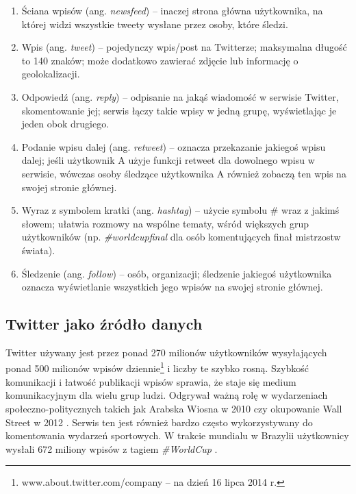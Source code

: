 \begin{enumerate}
  \item Ściana wpisów (ang. \textit{newsfeed}) -- inaczej strona główna 
  użytkownika, na której widzi wszystkie tweety wysłane przez osoby, które śledzi.
  
  \item Wpis (ang. \textit{tweet}) -- pojedynczy wpis/post na Twitterze; 
  maksymalna długość to 140 znaków; może dodatkowo zawierać zdjęcie lub 
  informację o geolokalizacji.

  \item Odpowiedź (ang. \textit{reply}) -- odpisanie na jakąś wiadomość w serwisie
  Twitter, skomentowanie jej; serwis łączy takie wpisy w jedną grupę, wyświetlając
  je jeden obok drugiego.
  
  \item Podanie wpisu dalej (ang. \textit{retweet}) -- oznacza przekazanie 
  jakiegoś wpisu dalej; jeśli użytkownik A użyje funkcji
  retweet dla dowolnego wpisu w serwisie, wówczas osoby śledzące użytkownika A
  również zobaczą ten wpis na swojej stronie głównej.
  
  \item Wyraz z symbolem kratki (ang. \textit{hashtag}) -- użycie symbolu \# 
  wraz z jakimś słowem; ułatwia rozmowy na wspólne tematy, wśród większych grup
  użytkowników (np. \textit{\#worldcupfinal} dla osób komentujących finał 
  mistrzostw świata).

  \item Śledzenie (ang. \textit{follow}) -- osób, organizacji; śledzenie 
  jakiegoś użytkownika oznacza wyświetlanie wszystkich jego wpisów na swojej 
  stronie głównej.
\end{enumerate} 

\subsection{Twitter jako źródło danych}
\label{subsection:twitterjakozrodlodanych}
Twitter używany jest przez ponad 270 milionów użytkowników wysyłających ponad
500 milionów wpisów dziennie\footnote{www.about.twitter.com/company -- na dzień 16
lipca 2014 r.} i liczby te szybko rosną.
Szybkość komunikacji i łatwość publikacji wpisów
sprawia, że staje się medium komunikacyjnym dla wielu grup ludzi.
Odgrywał ważną rolę w wydarzeniach społeczno-politycznych
takich jak Arabska Wiosna w 2010 czy okupowanie Wall Street w 2012 
\cite{TwitterDataAnalytics2013}.
Serwis ten jest również bardzo często wykorzystywany do komentowania wydarzeń
sportowych. W trakcie mundialu w Brazylii użytkownicy wysłali 672 miliony
wpisów z tagiem \textit{\#WorldCup} \cite{TwitterStatsWorldCup}.

